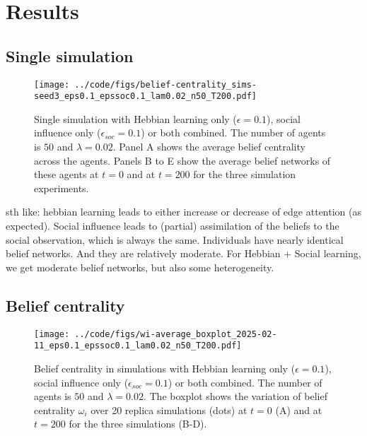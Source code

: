 \documentclass[10pt]{article}
\begin{document}
\section{Results}


\FloatBarrier
\subsection{Single simulation}

\begin{figure}[h!]
    \centering
    \texttt{[image: ../code/figs/belief-centrality\_sims-seed3\_eps0.1\_epssoc0.1\_lam0.02\_n50\_T200.pdf]}
    \caption{Single simulation with Hebbian learning only ($\epsilon=0.1$), social influence only ($\epsilon_{soc}=0.1$) or both combined. The number of agents is $50$ and $\lambda=0.02$. Panel A shows the average belief centrality across the agents. Panels B to E show the average belief networks of these agents at $t=0$ and at $t=200$ for the three simulation experiments.}
    \label{fig:}
\end{figure}



sth like: hebbian learning leads to either increase or decrease of edge attention (as expected). Social influence leads to (partial) assimilation of the beliefs to the social observation, which is always the same. Individuals have nearly identical belief networks. And they are relatively moderate. For Hebbian + Social learning, we get moderate belief networks, but also some heterogeneity. 


\FloatBarrier
\subsection{Belief centrality}



\begin{figure}[h!]
    \centering
    \texttt{[image: ../code/figs/wi-average\_boxplot\_2025-02-11\_eps0.1\_epssoc0.1\_lam0.02\_n50\_T200.pdf]}
    \caption{Belief centrality in simulations with Hebbian learning only ($\epsilon=0.1$), social influence only ($\epsilon_{soc}=0.1$) or both combined. The number of agents is $50$ and $\lambda=0.02$. The boxplot shows the variation of belief centrality $\omega_{i}$ over 20 replica simulations (dots) at $t=0$ (A) and at $t=200$ for the three simulations (B-D).}
\end{figure}
\end{document}
